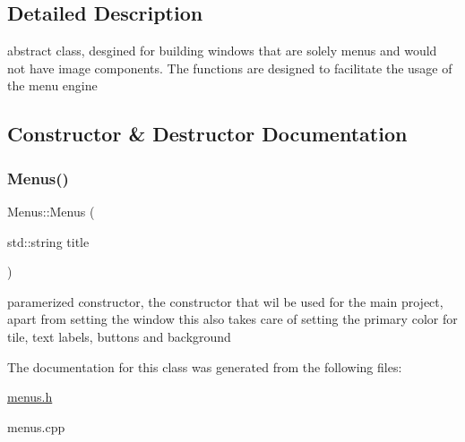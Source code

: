 \subsection{Detailed Description}
abstract class, desgined for building windows that are solely menus and would not have image components. The functions are designed to facilitate the usage of the menu engine 

\subsection{Constructor \& Destructor Documentation}
\hypertarget{class_menus_a79335eb0ba0047d0d9a52a646b191c68}{}\label{class_menus_a79335eb0ba0047d0d9a52a646b191c68} 
\subsubsection{\texorpdfstring{Menus()}{Menus()}}
{\footnotesize\ttfamily Menus\+::\+Menus (\begin{DoxyParamCaption}\item[{std\+::string}]{title }\end{DoxyParamCaption})}

paramerized constructor, the constructor that wil be used for the main project, apart from setting the window this also takes care of setting the primary color for tile, text labels, buttons and background 

The documentation for this class was generated from the following files\+:\begin{DoxyCompactItemize}
\item 
\hyperlink{menus_8h}{menus.\+h}\item 
menus.\+cpp\end{DoxyCompactItemize}

